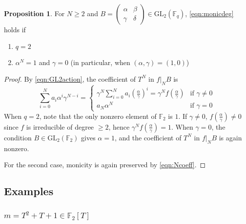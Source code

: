 \documentclass[10pt,reqno]{amsproc}
\newcommand{\GL}{\mathrm{GL}}
\newcommand{\bF}{\mathbb{F}}
\newcommand{\1}{\mathds{1}}	%
\theoremstyle{definition}
\newtheorem{proposition}[theorem]{Proposition}
\theoremstyle{remark}
\begin{document}
\begin{proposition}
    \label{prop:Bchoice1}
    For $N \ge 2$ and $B = \left(\begin{smallmatrix} \alpha & \beta \\ \gamma & \delta \end{smallmatrix}\right) \in \GL_2(\bF_q)$, \eqref{eqn:monicdeg} holds if
    \begin{enumerate}
        \item $q = 2$
        \item $\alpha^N = 1$ and $\gamma = 0$ (in particular, when $(\alpha, \gamma) = (1, 0)$)
    \end{enumerate}
\end{proposition}
\begin{proof}
    By \eqref{eqn:GL2action}, the coefficient of $T^N$ in $f|_N B$ is
    \begin{equation}
        \label{eqn:Ncoeff}
        \sum_{i=0}^{N} a_i \alpha^i \gamma^{N-i} = \begin{cases}
            \gamma^N \sum_{i=0}^{N} a_i \left(\frac{\alpha}{\gamma}\right)^i = \gamma^N f\left(\frac{\alpha}{\gamma}\right) & \text{if }\gamma \ne 0 \\
            a_N \alpha^N & \text{if }\gamma = 0
        \end{cases}
    \end{equation}
    When $q = 2$, note that the only nonzero element of $\bF_2$ is $1$.
    If $\gamma \ne 0$, $f(\frac{\alpha}{\gamma}) \ne 0$ since $f$ is irreducible of degree $\ge 2$, hence $\gamma^N f(\frac{\alpha}{\gamma}) = 1$.
    When $\gamma = 0$, the condition $B \in \GL_2(\bF_2)$ gives $\alpha = 1$, and the coefficient of $T^N$ in $f|_N B$ is again nonzero.

    For the second case, monicity is again preserved by \eqref{eqn:Ncoeff}.
\end{proof}



\subsection{Examples}

\subsubsection{\texorpdfstring{\(m = T^2 + T + 1 \in \bF_2[T]\)}{m = T^2 + T + 1 over characteristic 2}}
\label{subsec:bij_T2T1}
\end{document}
